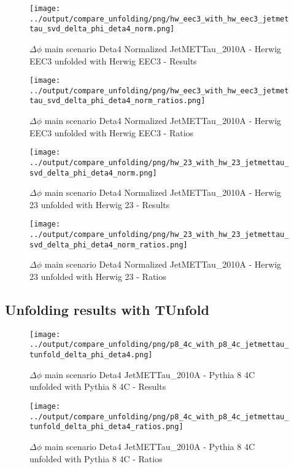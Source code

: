 \documentclass[11pt]{book}
\begin{document}
\begin{figure}[ht]
\centering
\texttt{[image: ../output/compare\_unfolding/png/hw\_eec3\_with\_hw\_eec3\_jetmettau\_svd\_delta\_phi\_deta4\_norm.png]}
\caption{$\Delta\phi$ main scenario Deta4 Normalized JetMETTau\_2010A - Herwig EEC3 unfolded with Herwig EEC3 - Results}
\label{hw_eec3_hw_eec3_jetmettau_svd_delta_phi_deta4_norm_a}
\end{figure}

\begin{figure}[ht]
\centering
\texttt{[image: ../output/compare\_unfolding/png/hw\_eec3\_with\_hw\_eec3\_jetmettau\_svd\_delta\_phi\_deta4\_norm\_ratios.png]}
\caption{$\Delta\phi$ main scenario Deta4 Normalized JetMETTau\_2010A - Herwig EEC3 unfolded with Herwig EEC3 - Ratios}
\label{hw_eec3_hw_eec3_jetmettau_svd_delta_phi_deta4_norm_b}
\end{figure}

\begin{figure}[ht]
\centering
\texttt{[image: ../output/compare\_unfolding/png/hw\_23\_with\_hw\_23\_jetmettau\_svd\_delta\_phi\_deta4\_norm.png]}
\caption{$\Delta\phi$ main scenario Deta4 Normalized JetMETTau\_2010A - Herwig 23 unfolded with Herwig 23 - Results}
\label{hw_23_hw_23_jetmettau_svd_delta_phi_deta4_norm_a}
\end{figure}

\begin{figure}[ht]
\centering
\texttt{[image: ../output/compare\_unfolding/png/hw\_23\_with\_hw\_23\_jetmettau\_svd\_delta\_phi\_deta4\_norm\_ratios.png]}
\caption{$\Delta\phi$ main scenario Deta4 Normalized JetMETTau\_2010A - Herwig 23 unfolded with Herwig 23 - Ratios}
\label{hw_23_hw_23_jetmettau_svd_delta_phi_deta4_norm_b}
\end{figure}


\clearpage
\subsection{Unfolding results with TUnfold}

\begin{figure}[ht]
\centering
\texttt{[image: ../output/compare\_unfolding/png/p8\_4c\_with\_p8\_4c\_jetmettau\_tunfold\_delta\_phi\_deta4.png]}
\caption{$\Delta\phi$ main scenario Deta4 JetMETTau\_2010A - Pythia 8 4C unfolded with Pythia 8 4C - Results}
\label{p8_p8_jetmettau_tunfold_delta_phi_deta4_a}
\end{figure}

\begin{figure}[ht]
\centering
\texttt{[image: ../output/compare\_unfolding/png/p8\_4c\_with\_p8\_4c\_jetmettau\_tunfold\_delta\_phi\_deta4\_ratios.png]}
\caption{$\Delta\phi$ main scenario Deta4 JetMETTau\_2010A - Pythia 8 4C unfolded with Pythia 8 4C - Ratios}
\label{p8_p8_jetmettau_tunfold_delta_phi_deta4_b}
\end{figure}
\end{document}
